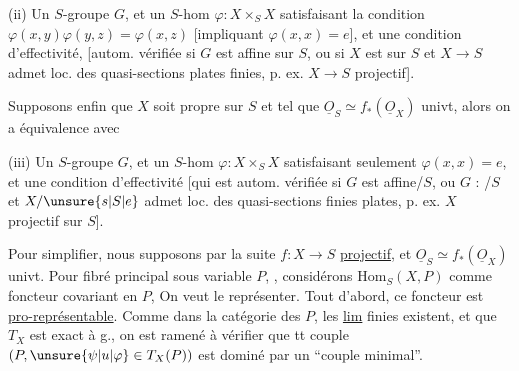 
(ii) Un  $S$-groupe $G$, et un $S$-hom $\varphi:X\times_S X$ satisfaisant
la condition  $\varphi(x,y)\varphi(y,z)=\varphi(x,z)$ [impliquant $\varphi(x,x)=e$],
 et une condition d'effectivité, [autom. vérifiée
si $G$ est affine sur $S$, ou si $X$ est  sur $S$
et $X\longrightarrow S$ admet loc. des quasi-sections plates finies,
p. ex. $X\longrightarrow S$ projectif].


Supposons enfin que  $X$ soit  propre sur $S$
et tel que $\underline O_S\simeq f_*(\underline O_X)$ univt, alors on a équivalence
avec

(iii) Un $S$-groupe $G$, et un $S$-hom $\varphi:X\times_S X$ satisfaisant
seulement $\varphi(x,x)=e$, et une condition d'effectivité
[qui est autom. vérifiée si $G$ est affine/$S$, ou $G$ :
/$S$ et $X/\unsure{s|S|e}$ admet loc. des quasi-sections finies
plates, p. ex. $X$ projectif sur $S$].


Pour simplifier, nous supposons par la suite
$f:X\longrightarrow S$ \uline{projectif}, et $\underline O_S\simeq f_*(\underline O_X)$ univt. Pour
fibré principal sous variable $P$, , considérons
$\mathrm{Hom}_S(X,P)$ comme foncteur covariant en $P$,  On veut
le représenter. Tout d'abord, ce foncteur est \uline{pro-représentable}. Comme dans la catégorie des $P$, les \uline{lim}
finies existent, et que $T_X$ est exact à g., on est
ramené à vérifier que tt couple $(P,\unsure{\psi|u|\varphi}\in T_X(P))$
est  dominé par un ``couple minimal''.

